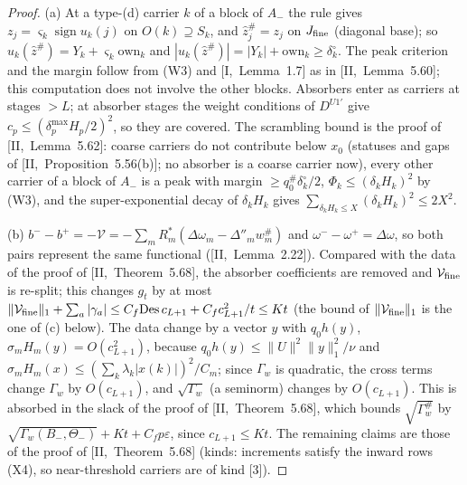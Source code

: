 \documentclass[10pt]{amsart}
\theoremstyle{definition}
\theoremstyle{remark}
\newcommand{\sgn}{\operatorname{sign}}
\newcommand{\zh}{\hat z}
\begin{document}
\begin{proof}
(a) At a type-(d) carrier $k$ of a block of $A_-$ the rule gives $z_j=
\varsigma_k\sgn u_k(j)$ on $O(k)\supseteq S_k$, and $\zh^\#_j=z_j$ on $J_{\rm fine}$
(diagonal base); so $u_k(\zh^\#)=Y_k+\varsigma_k\mathrm{own}_k$ and $|u_k(\zh^\#)|=
|Y_k|+\mathrm{own}_k\ge\delta^\circ_k$.  The peak criterion and the margin follow
from (W3) and [I,~Lemma~1.7] as in [II,~Lemma~5.60]; this computation does not
involve the other blocks.  Absorbers enter as carriers at stages $>L$; at
absorber stages the weight conditions of $D^{U1'}$ give $c_p\le(\delta^{\max}_p
H_p/2)^2$, so they are covered.  The scrambling bound is the proof of
[II,~Lemma~5.62]: coarse carriers do not contribute below $x_0$ (statuses and gaps
of [II,~Proposition~5.56(b)]; no absorber is a coarse carrier now), every other
carrier of a block of $A_-$ is a peak with margin $\ge q^\#_0\delta^\circ_k/2$,
$\Phi_k\le(\delta_kH_k)^2$ by (W3), and the super-exponential decay of
$\delta_kH_k$ gives $\sum_{\delta_kH_k\le X}(\delta_kH_k)^2\le2X^2$.

(b) $b^--b^+=-\mathcal V=-\sum_mR_m^*(\Delta\omega_m-\Delta''_mw^\#_m)$ and
$\omega^--\omega^+=\Delta\omega$, so both pairs represent the same functional
([II,~Lemma~2.22]).  Compared with the data of the proof of [II,~Theorem~5.68], the absorber
coefficients are removed and $\mathcal V_{\rm fine}$ is re-split; this changes
$g_t$ by at most $\|\mathcal V_{\rm fine}\|_1+\sum_a|\gamma_a|\le C_f\mathrm{Des}\,
c_{L+1}+C_fc_{L+1}^2/t\le Kt$ (the bound of $\|\mathcal V_{\rm fine}\|_1$ is
the one of (c) below).  The data change by a vector $y$ with $q_0h(y)$,
$\sigma_mH_m(y)=O(c_{L+1}^2)$, because $q_0h(y)\le\|U\|^2\|y\|_1^2/\nu$ and
$\sigma_mH_m(x)\le(\sum_k\lambda_k|x(k)|)^2/C_m$; since $\Gamma_w$ is quadratic,
the cross terms change $\Gamma_w$ by $O(c_{L+1})$, and $\sqrt{\Gamma_w}$ (a
seminorm) changes by $O(c_{L+1})$.  This is absorbed in the slack of the
proof of [II,~Theorem~5.68], which bounds $\sqrt{\Gamma^\#_w}$ by
$\sqrt{\Gamma_w(B_-,\Theta_-)}+Kt+C_fp\varepsilon$, since $c_{L+1}\le Kt$.  The remaining
claims are those of the proof of [II,~Theorem~5.68] (kinds: increments satisfy the
inward rows (X4), so near-threshold carriers are of kind [3]).


\end{proof}
\end{document}
